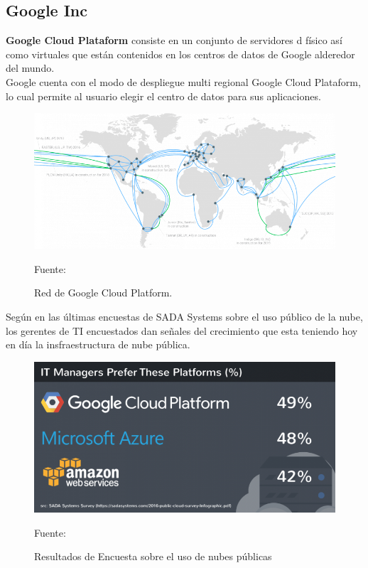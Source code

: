 \documentclass[a4paper, 12pt]{report}
\begin{document}
\subsection{Google Inc}
\begin{justify}
{\bf Google Cloud Plataform} consiste en un conjunto de servidores d f\'isico as\'i como virtuales que est\'an contenidos en los centros de datos de Google alderedor del mundo.
\\ Google cuenta con el modo de despliegue  multi regional Google Cloud Plataform, lo cual permite al usuario elegir el centro de datos para sus aplicaciones.
\end{justify}
\begin{figure}[ht]
\begin{center}
\includegraphics[scale=0.6]{google_cloud}
\end{center}
\begin{center}
\vskip -0.5cm
\caption{\small{Red de Google Cloud Platform.}}
{\small{Fuente: \cite{google_cloud}}}
\end{center}
\end{figure}
\begin{justify}
Según \cite{google_cloud} en las \'ultimas encuestas de SADA Systems sobre el uso p\'ublico de la nube, los  gerentes de TI encuestados dan se\~{n}ales del crecimiento que esta teniendo hoy en día la insfraestructura de nube p\'ublica.
\end{justify}
\begin{figure}[ht]
\begin{center}
\includegraphics[scale=0.4]{encuesta}
\end{center}
\begin{center}
\vskip -0.5cm
\caption{\small{Resultados de Encuesta sobre el uso de nubes p\'ublicas}}
{\small{Fuente: \cite{google_cloud}}}
\end{center}
\end{figure}
\end{document}
